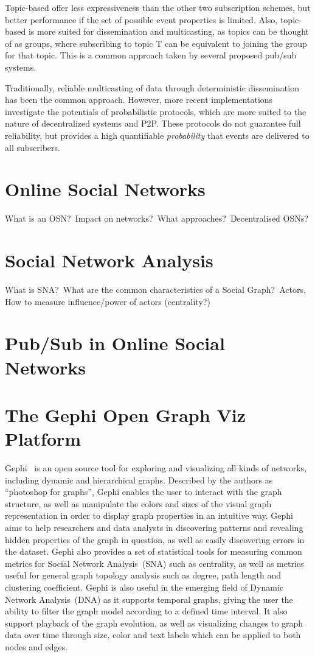 Topic-based offer less expressiveness than the other two subscription
schemes, but better performance if the set of possible event properties
is limited. Also, topic-based is more suited for dissemination and
multicasting, as topics can be thought of as groups, where subscribing
to topic T can be equivalent to joining the group for that topic. This
is a common approach taken by several proposed pub/sub
systems\cite{needs citation}.

Traditionally, reliable multicasting of data through deterministic
dissemination has been the common approach. However, more recent
implementations investigate the potentials of probabilistic protocols,
which are more suited to the nature of decentralized systems and P2P.
These protocols do not guarantee full reliability, but provides a high
quantifiable \emph{probability} that events are delivered to all
subscribers.

\section{Online Social Networks}
What is an OSN?\ Impact on networks?\ What approaches?\ Decentralised OSNs?

\section{Social Network Analysis}
What is SNA?\ What are the common characteristics of a Social Graph?\
Actors, How to measure influence/power of actors (centrality?)

\section{Pub/Sub in Online Social Networks}

\section{The Gephi Open Graph Viz Platform} Gephi~\cite{ICWSM09154} is
an open source tool for exploring and visualizing all kinds of networks,
including dynamic and hierarchical graphs. Described by the authors as
``photoshop for graphs'', Gephi enables the user to interact with the
graph structure, as well as manipulate the colors and sizes of the
visual graph representation in order to display graph properties in an
intuitive way. Gephi aims to help researchers and data analysts in
discovering patterns and revealing hidden properties of the graph in
question, as well as easily discovering errors in the dataset. Gephi
also provides a set of statistical tools for measuring common metrics
for Social Network Analysis~(SNA) such as centrality, as well as metrics
useful for general graph topology analysis such as degree, path length
and clustering coefficient. Gephi is also useful in the emerging field of
Dynamic Network Analysis~(DNA)  as it supports temporal graphs,
giving the user the ability to filter the graph model according to a
defined time interval. It also support playback of the graph evolution,
as well as visualizing changes to graph data over time through size,
color and text labels which can be applied to both nodes and edges.

